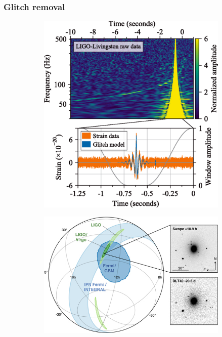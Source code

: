 \documentclass[a4paper,12pt,onecolumn,twoside]{article}
\begin{document}
		\subsubsection{Glitch removal}
			\begin{figure}[t]
				\begin{subfigure}{0.45\textwidth}
					\includegraphics[width=\textwidth]{glitch.png}
					\caption{}
					\label{fig:glitch}
				\end{subfigure}
				\begin{subfigure}{0.45\textwidth}
					\includegraphics[width=\textwidth]{localization.png}

\end{subfigure}
\end{figure}
\end{document}
